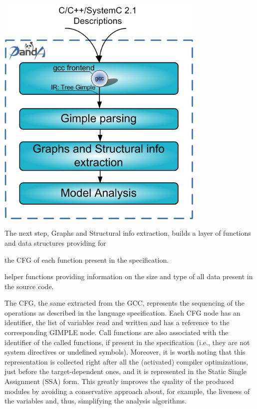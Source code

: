  
\begin{DoxyImage}
\includegraphics[width=10cm]{panda_flow.png}
\end{DoxyImage}


The next step, Graphs and Structural info extraction, builds a layer of functions and data structures providing for
\begin{DoxyItemize}
\item the C\+FG of each function present in the specification.
\item helper functions providing information on the size and type of all data present in the source code.
\end{DoxyItemize}

The C\+FG, the same extracted from the G\+CC, represents the sequencing of the operations as described in the language specification. Each C\+FG node has an identifier, the list of variables read and written and has a reference to the corresponding G\+I\+M\+P\+LE node. Call functions are also associated with the identifier of the called functions, if present in the specification (i.\+e., they are not system directives or undefined symbols). Moreover, it is worth noting that this representation is collected right after all the (activated) compiler optimizations, just before the target-\/dependent ones, and it is represented in the Static Single Assignment (S\+SA) form. This greatly improves the quality of the produced modules by avoiding a conservative approach about, for example, the liveness of the variables and, thus, simplifying the analysis algorithms.

